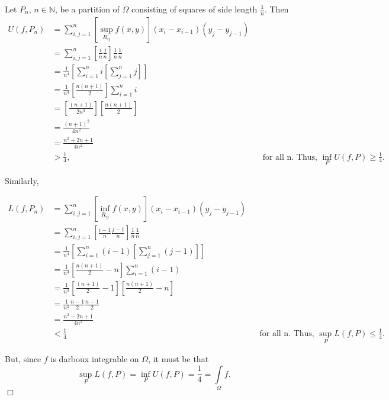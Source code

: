 \documentclass[11pt]{article}
\begin{document}
\vspace{.1in}
 
\noindent Let $P_n$, $n\in\mathbb{N}$, be a partition of $\Omega$ consisting of squares of side length $\frac{1}{n}$. Then
\begin{align*}
U(f,P_n)&=\sum\limits_{i,j=1}^n\left[\sup\limits_{R_{ij}}f(x,y)\right]\left(x_i-x_{i-1}\right)\left(y_j-y_{j-1}\right)\\&=\sum\limits_{i,j=1}^n\left[\frac{i}{n}\frac{j}{n}\right]\frac{1}{n}\frac{1}{n}\\&=\frac{1}{n^4}\left[\sum\limits_{i=1}^ni\left[\sum\limits_{j=1}^nj\right]\right]\\&=\frac{1}{n^4}\left[\frac{n(n+1)}{2}\right]\sum\limits_{i=1}^ni\\&=\left[\frac{(n+1)}{2n^3}\right]\left[\frac{n(n+1)}{2}\right]\\&=\frac{(n+1)^2}{4n^2}\\&=\frac{n^2+2n+1}{4n^2}\\&>\frac{1}{4},&&\text{for all n. Thus, } \inf\limits_PU(f,P)\geq \frac{1}{4}.
\end{align*}

\noindent Similarly,

\begin{align*}
L(f,P_n)&=\sum\limits_{i,j=1}^n\left[\inf\limits_{R_{ij}}f(x,y)\right]\left(x_i-x_{i-1}\right)\left(y_j-y_{j-1}\right)\\&=\sum\limits_{i,j=1}^n\left[\frac{i-1}{n}\frac{j-1}{n}\right]\frac{1}{n}\frac{1}{n}\\&=\frac{1}{n^4}\left[\sum\limits_{i=1}^n(i-1)\left[\sum\limits_{j=1}^n(j-1)\right]\right]\\&=\frac{1}{n^4}\left[\frac{n(n+1)}{2}-n\right]\sum\limits_{i=1}^n(i-1)\\&=\frac{1}{n^3}\left[\frac{(n+1)}{2}-1\right]\left[\frac{n(n+1)}{2}-n\right]\\&=\frac{1}{n^2}\frac{n-1}{2}\frac{n-1}{2}\\&=\frac{n^2-2n+1}{4n^2}\\&<\frac{1}{4}&&\text{for all n. Thus, }\sup\limits_PL(f,P)\leq\frac{1}{4}.
\end{align*}
\vspace{.1in}

\noindent But, since $f$ is darboux integrable on $\Omega$, it must be that
\[
\sup\limits_PL(f,P)=\inf\limits_PU(f,P)=\frac{1}{4}=\int\limits_\Omega f.
\]
\hfill	$\Box$

\vspace{.2in}
\end{document}
